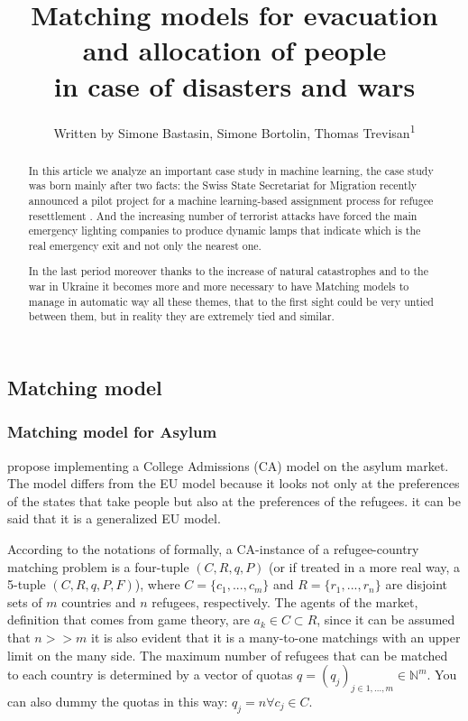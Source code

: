 \documentclass[letterpaper]{article} %
\title{Matching models for evacuation and allocation of people\\in case of disasters and wars}
\author{
    Written by Simone Bastasin, Simone Bortolin, Thomas Trevisan\textsuperscript{\rm 1}
    \\
}
\begin{document}
    \maketitle

    \begin{abstract}
        In this article we analyze an important case study in machine learning, the case study was born mainly after two facts:
        the Swiss State Secretariat for Migration recently announced a pilot project for a machine
        learning-based assignment process for refugee resettlement \cite{olbergml}.
        And the increasing number of terrorist attacks have forced the main emergency lighting companies to produce dynamic lamps
        that indicate which is the real emergency exit and not only the nearest one.

        In the last period moreover thanks to the increase of natural catastrophes and to the war in Ukraine it becomes more and more
        necessary to have Matching models to manage in automatic way all these themes, that to the first sight could be very untied
        between them, but in reality they are extremely tied and similar.
    \end{abstract}

    \noindent \cite{olbergml,basshuysen,delacretaz_2020,andersson}

    \subsection{Matching model}

    \cite{olbergml,basshuysen,delacretaz_2020}

    \subsubsection{Matching model for Asylum}

    \cite{olbergml,basshuysen,delacretaz_2020,fernandez} propose implementing a College Admissions (CA)
    model on the asylum market. The model differs from the EU model\cite{basshuysen} because it looks not only at the preferences of the states that take people but also at the preferences of the refugees.
    it can be said that it is a generalized EU model.

    According to the notations of \cite{salles} formally, a CA-instance of a refugee-country matching problem is a four-tuple \((C, R, q, P)\)
    (or if treated in a more real way, a 5-tuple \((C, R, q, P, F)\)), where
    \(C = \{c_1, ..., c_m\}\) and \(R = \{r_1, ...,r_n\}\) are disjoint sets of \(m\) countries and \(n\) refugees, respectively.
    The agents of the market, definition that comes from game theory, are \(a_k \in C\subset R\),
    since it can be assumed that \(n >> m\) it is also evident that it is a many-to-one matchings with an upper limit on the many side.
    The maximum number of refugees that can be matched to
    each country is determined by a vector of quotas \(q = (q_j)_{j\in {1,...,m}} \in \mathbb{N}^m\).
    You can also dummy the quotas in this way:  \(q_j = n \forall c_j \in C\).
\end{document}
